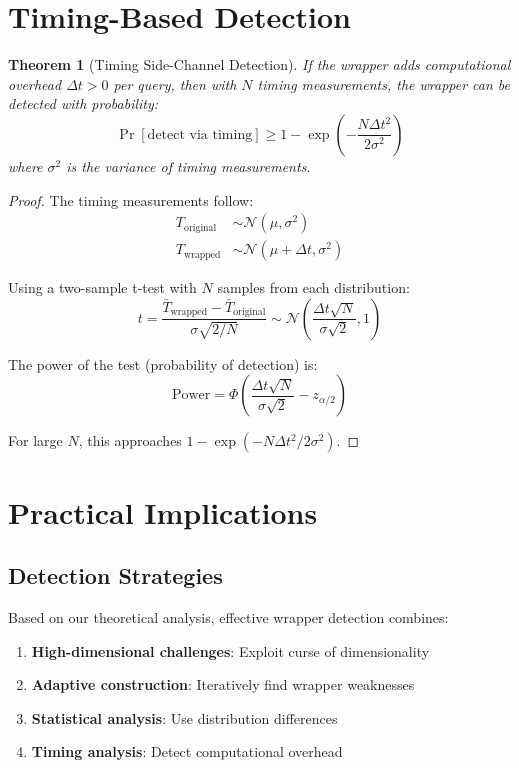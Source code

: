 \documentclass[11pt]{article}
\theoremstyle{plain}
\newtheorem{theorem}{Theorem}
\begin{document}
\section{Timing-Based Detection}

\begin{theorem}[Timing Side-Channel Detection]
\label{thm:timing}
If the wrapper adds computational overhead $\Delta t > 0$ per query, then 
with $N$ timing measurements, the wrapper can be detected with probability:
$$\Pr[\text{detect via timing}] \geq 1 - \exp\left(-\frac{N \Delta t^2}{2\sigma^2}\right)$$
where $\sigma^2$ is the variance of timing measurements.
\end{theorem}

\begin{proof}
The timing measurements follow:
\begin{align}
T_{\text{original}} &\sim \mathcal{N}(\mu, \sigma^2) \\
T_{\text{wrapped}} &\sim \mathcal{N}(\mu + \Delta t, \sigma^2)
\end{align}

Using a two-sample t-test with $N$ samples from each distribution:
$$t = \frac{\bar{T}_{\text{wrapped}} - \bar{T}_{\text{original}}}{\sigma\sqrt{2/N}} \sim \mathcal{N}\left(\frac{\Delta t \sqrt{N}}{\sigma\sqrt{2}}, 1\right)$$

The power of the test (probability of detection) is:
$$\text{Power} = \Phi\left(\frac{\Delta t \sqrt{N}}{\sigma\sqrt{2}} - z_{\alpha/2}\right)$$

For large $N$, this approaches $1 - \exp(-N\Delta t^2/2\sigma^2)$.
\end{proof}

\section{Practical Implications}

\subsection{Detection Strategies}
Based on our theoretical analysis, effective wrapper detection combines:
\begin{enumerate}
    \item \textbf{High-dimensional challenges}: Exploit curse of dimensionality
    \item \textbf{Adaptive construction}: Iteratively find wrapper weaknesses
    \item \textbf{Statistical analysis}: Use distribution differences
    \item \textbf{Timing analysis}: Detect computational overhead
\end{enumerate}
\end{document}
